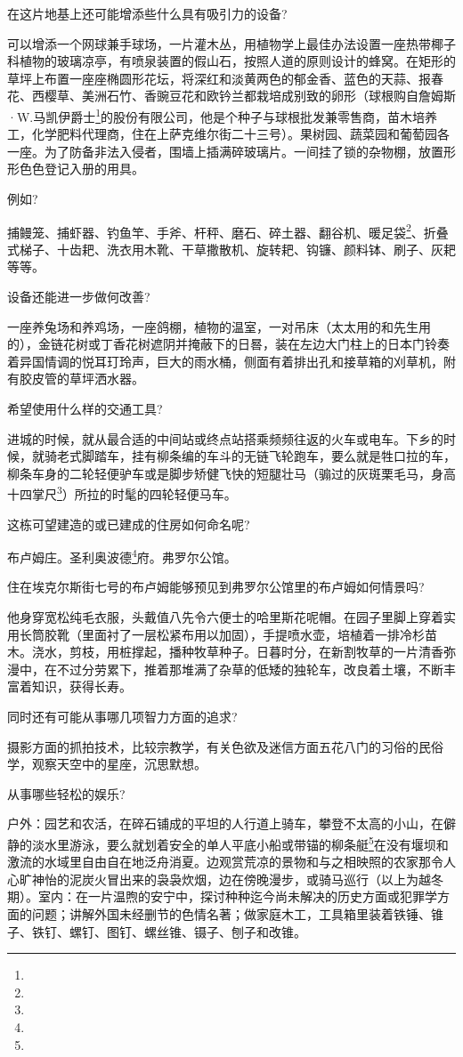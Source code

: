\par 在这片地基上还可能增添些什么具有吸引力的设备?
\par 可以增添一个网球兼手球场，一片灌木丛，用植物学上最佳办法设置一座热带椰子科植物的玻璃凉亭，有喷泉装置的假山石，按照人道的原则设计的蜂窝。在矩形的草坪上布置一座座椭圆形花坛，将深红和淡黄两色的郁金香、蓝色的天蒜、报春花、西樱草、美洲石竹、香豌豆花和欧钤兰都栽培成别致的卵形（球根购自詹姆斯·W.马凯伊爵士\footnote{}的股份有限公司，他是个种子与球根批发兼零售商，苗木培养工，化学肥料代理商，住在上萨克维尔街二十三号）。果树园、蔬菜园和葡萄园各一座。为了防备非法入侵者，围墙上插满碎玻璃片。一间挂了锁的杂物棚，放置形形色色登记入册的用具。
\par 例如?
\par 捕鳗笼、捕虾器、钓鱼竿、手斧、杆秤、磨石、碎土器、翻谷机、暖足袋\footnote{}、折叠式梯子、十齿耙、洗衣用木靴、干草撒散机、旋转耙、钩镰、颜料钵、刷子、灰耙等等。
\par 设备还能进一步做何改善?
\par 一座养兔场和养鸡场，一座鸽棚，植物的温室，一对吊床（太太用的和先生用的），金链花树或丁香花树遮阴并掩蔽下的日晷，装在左边大门柱上的日本门铃奏着异国情调的悦耳玎玲声，巨大的雨水桶，侧面有着排出孔和接草箱的刈草机，附有胶皮管的草坪洒水器。
\par 希望使用什么样的交通工具?
\par 进城的时候，就从最合适的中间站或终点站搭乘频频往返的火车或电车。下乡的时候，就骑老式脚踏车，挂有柳条编的车斗的无链飞轮跑车，要么就是牲口拉的车，柳条车身的二轮轻便驴车或是脚步矫健飞快的短腿壮马（骟过的灰斑栗毛马，身高十四掌尺\footnote{}）所拉的时髦的四轮轻便马车。
\par 这栋可望建造的或已建成的住房如何命名呢?
\par 布卢姆庄。圣利奥波德\footnote{}府。弗罗尔公馆。
\par 住在埃克尔斯街七号的布卢姆能够预见到弗罗尔公馆里的布卢姆如何情景吗?
\par 他身穿宽松纯毛衣服，头戴值八先令六便士的哈里斯花呢帽。在园子里脚上穿着实用长筒胶靴（里面衬了一层松紧布用以加固），手提喷水壶，培植着一排冷杉苗木。浇水，剪枝，用桩撑起，播种牧草种子。日暮时分，在新割牧草的一片清香弥漫中，在不过分劳累下，推着那堆满了杂草的低矮的独轮车，改良着土壤，不断丰富着知识，获得长寿。
\par 同时还有可能从事哪几项智力方面的追求?
\par 摄影方面的抓拍技术，比较宗教学，有关色欲及迷信方面五花八门的习俗的民俗学，观察天空中的星座，沉思默想。
\par 从事哪些轻松的娱乐?
\par 户外：园艺和农活，在碎石铺成的平坦的人行道上骑车，攀登不太高的小山，在僻静的淡水里游泳，要么就划着安全的单人平底小船或带锚的柳条艇\footnote{}在没有堰坝和激流的水域里自由自在地泛舟消夏。边观赏荒凉的景物和与之相映照的农家那令人心旷神怡的泥炭火冒出来的袅袅炊烟，边在傍晚漫步，或骑马巡行（以上为越冬期）。室内：在一片温煦的安宁中，探讨种种迄今尚未解决的历史方面或犯罪学方面的问题；讲解外国未经删节的色情名著；做家庭木工，工具箱里装着铁锤、锥子、铁钉、螺钉、图钉、螺丝锥、镊子、刨子和改锥。
